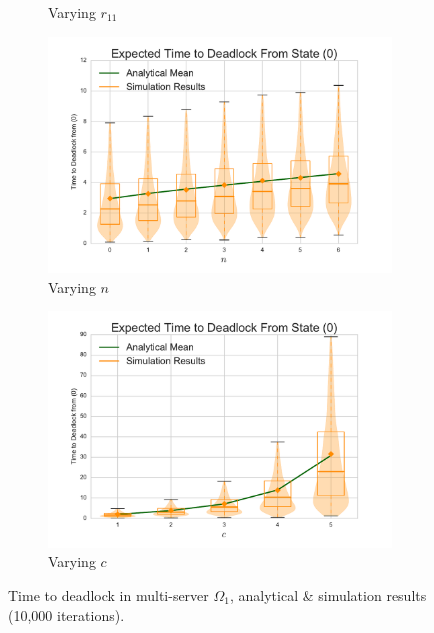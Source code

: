 \documentclass{article}
\begin{document}
\begin{figure}[!htbp]
\begin{subfigure}[b]{0.5\textwidth}
    \caption{Varying $r_{11}$}
    \label{fig:1Nms_r11}
  \end{subfigure}
  \begin{subfigure}[b]{0.5\textwidth}
    \includegraphics[width=\textwidth]{images/varyn_1Nms}
    \caption{Varying $n$}
    \label{fig:1Nms_n}
  \end{subfigure}
  \begin{center}
  \begin{subfigure}[b]{0.5\textwidth}
    \includegraphics[width=\textwidth]{images/varyc_1Nms}
    \caption{Varying $c$}
    \label{fig:1Nms_c}
  \end{subfigure}
  \end{center}
  \caption{Time to deadlock in multi-server $\Omega_1$, analytical \& simulation results (10,000 iterations).}
  \label{fig:timestodeadlock1nodemultiserver}
\end{figure}
\end{document}
